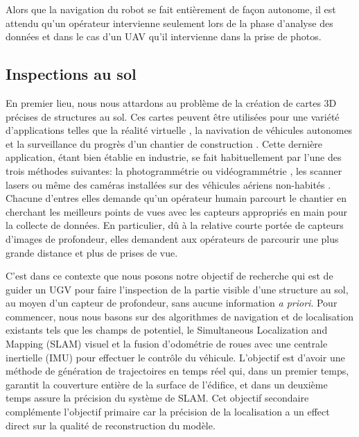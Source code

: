 Alors que la navigation du robot se fait entièrement de façon autonome, il est attendu qu'un opérateur intervienne seulement lors de la phase d'analyse des données et dans le cas d'un UAV qu'il intervienne dans la prise de photos.

\subsection{Inspections au sol}
En premier lieu, nous nous attardons au problème de la création de cartes 3D précises de structures au sol. Ces cartes peuvent être utilisées pour une variété d'applications telles que la réalité virtuelle \citep{googlevr2017}, la navivation de véhicules autonomes \citep{deepmap2017} et la surveillance du progrès d'un chantier de construction \citep{Omar2018}. Cette dernière application, étant bien établie en industrie, se fait habituellement par l'une des trois méthodes suivantes: la photogrammétrie ou vidéogrammétrie \citep{BRILAKIS2011884}, les scanner lasers \citep{Turkan2012} ou même des caméras installées sur des véhicules aériens non-habités \citep{lin2015framework}. Chacune d'entres elles demande qu'un opérateur humain parcourt le chantier en cherchant les meilleurs points de vues avec les capteurs appropriés en main pour la collecte de données. En particulier, dû à la relative courte portée de capteurs d'images de profondeur, elles demandent aux opérateurs de parcourir une plus grande distance et plus de prises de vue.

C'est dans ce contexte que nous posons notre objectif de recherche qui est de guider un UGV pour faire l'inspection de la partie visible d'une structure au sol, au moyen d'un capteur de profondeur, sans aucune information \textit{a priori}. Pour commencer, nous nous basons sur des algorithmes de navigation et de localisation existants tels que les champs de potentiel, le Simultaneous Localization and Mapping (SLAM) visuel et la fusion d'odométrie de roues avec une centrale inertielle (IMU) pour effectuer le contrôle du véhicule. L'objectif est d'avoir une méthode de génération de trajectoires en temps réel qui, dans un premier temps, garantit la couverture entière de la surface de l'édifice, et dans un deuxième temps assure la précision du système de SLAM. Cet objectif secondaire complémente l'objectif primaire car la précision de la localisation a un effect direct sur la qualité de reconstruction du modèle.

